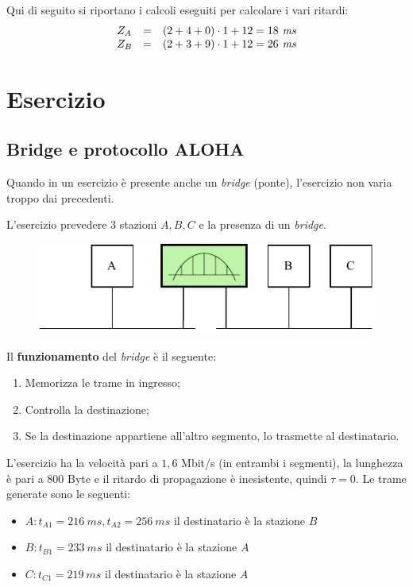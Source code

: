 \documentclass[a4paper]{article}
\begin{document}
	\noindent
	Qui di seguito si riportano i calcoli eseguiti per calcolare i vari ritardi:
	\begin{equation*}
		\begin{array}{lll}
			Z_{A}		& = & \left(2+4+0\right) \cdot 1 + 12 = 18 \emph{ ms} \\
			Z_{B}		& = & \left(2+3+9\right) \cdot 1 + 12 = 26 \emph{ ms}
		\end{array}
	\end{equation*}\newpage

	\section{\textcolor{Red3}{Esercizio}}
	
	\subsection{\textcolor{Red3}{Bridge e protocollo ALOHA}}
	
	Quando in un esercizio è presente anche un \emph{bridge} (ponte), l'esercizio non varia troppo dai precedenti.\newline
	
	\noindent
	L'esercizio prevedere $3$ stazioni $A,B,C$ e la presenza di un \emph{bridge}.
	\begin{figure}[!htp]
		\centering
		\includegraphics[width=.8\textwidth]{img/eg_bridge.pdf}
	\end{figure}
	
	\noindent
	Il \textbf{funzionamento} del \emph{bridge} è il seguente:
	\begin{enumerate}
		\item Memorizza le trame in ingresso;
		\item Controlla la destinazione;
		\item Se la destinazione appartiene all'altro segmento, lo trasmette al destinatario.
	\end{enumerate}
	L'esercizio ha la velocità pari a $1,6$ Mbit/s (in entrambi i segmenti), la lunghezza è pari a 800 Byte e il ritardo di propagazione è inesistente, quindi $\tau = 0$. Le trame generate sono le seguenti:
	\begin{itemize}[label=-]
		\item $A: t_{A1} = 216 \: ms, t_{A2} = 256 \: ms$ il destinatario è la stazione $B$
		\item $B: t_{B1} = 233 \: ms$ il destinatario è la stazione $A$
		\item $C: t_{C1} = 219 \: ms$ il destinatario è la stazione $A$
	\end{itemize}\newpage
\end{document}
